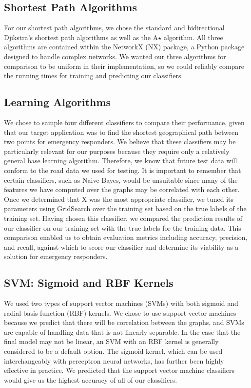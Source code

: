 \documentclass{article}
\begin{document}
\subsection{Shortest Path Algorithms}

For our shortest path algorithms, we chose the standard and bidirectional Djikstra's shortest path algorithms as well as the A$\star$ algorithm. All three algorithms are contained within the NetworkX (NX) package, a Python package designed to handle complex networks. We wanted our three algorithms for comparison to be uniform in their implementation, so we could reliably compare the running times for training and predicting our classifiers. 

\subsection{Learning Algorithms} 

We  chose to sample four different classifiers to compare their performance, given that our target application was to find the shortest geographical path between two points for emergency responders. We believe that these classifiers may be particularly relevant for our purposes because they require only a relatively general base learning algorithm. Therefore, we know that future test data will conform to the road data we used for testing. It is important to remember that certain classifiers, such as Naive Bayes, would be unsuitable since many of the features we have computed over the graphs may be correlated with each other. Once we determined that X was the most appropriate classifier, we tuned its parameters using GridSearch over the training set based on the true labels of the training set. Having chosen this classifier, we compared the prediction results of our classifier on our training set with the true labels for the training data. This comparison enabled us to obtain evaluation metrics including accuracy, precision, and recall, against which to score our classifier and determine its viability as a solution for emergency responders.

\subsection{SVM: Sigmoid and RBF Kernels}

We used two types of support vector machines (SVMs) with both sigmoid and radial basis function (RBF) kernels. We chose to use support vector machines because we predict that there will be correlation between the graphs, and SVMs are capable of handling data that is not linearly separable. In the case that the final model may not be linear, an SVM with an RBF kernel is generally considered to be a default option. The sigmoid kernel, which can be used interchangeably with perceptron neural networks, has further been highly effective in practice. We predicted that the support vector machine classifiers would give us the highest accuracy of all of our classifiers.
\end{document}
